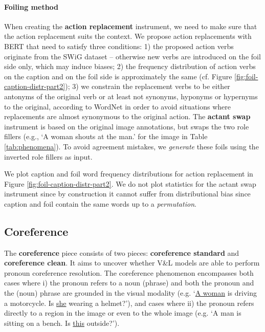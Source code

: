 \documentclass[11pt]{article}
\begin{document}
\paragraph{Foiling method}
When creating the \textbf{action replacement} instrument, we need to make sure that the action replacement suits the context. We propose action replacements with BERT \cite{devlin2019bert} that need to satisfy three conditions: 1) the proposed action verbs originate from the SWiG dataset -- otherwise new verbs are introduced on the foil side only, which may induce biases;
2) the frequency distribution of action verbs on the caption and on the foil side is approximately the same (cf. Figure \ref{fig:foil-caption-distr-part2});
3) we constrain the replacement verbs to be either antonyms of the original verb or at least not synonyms, hyponyms or hypernyms to the original, according to WordNet \cite{wordnet} in order to avoid situations where replacements are almost synonymous to the original action.
The \textbf{actant swap} instrument is based on the original image annotations, but swaps the two role fillers (e.g., `A woman shouts at the man.' for the image in Table \ref{tab:phenomena}). To avoid agreement mistakes, we \textit{generate} these foils using the inverted role fillers as input. 


We plot caption and foil word frequency distributions for action replacement in Figure \ref{fig:foil-caption-distr-part2}. We do not plot statistics for the actant swap instrument since by construction it cannot suffer from distributional bias since caption and foil contain the same words up to a \emph{permutation}.

\subsection{Coreference}\label{app:coref}

The \textbf{coreference} piece consists of two pieces: \textbf{coreference standard} and \textbf{coreference clean}. It aims to uncover whether V\&L models are able to perform pronoun coreference resolution. The coreference phenomenon encompasses both cases where i) the pronoun refers to a noun (phrase) and both the pronoun and the (noun) phrase are grounded in the visual modality (e.g. `\underline{A woman} is driving a motorcycle. Is \underline{she} wearing a helmet?'), and cases where ii) the pronoun refers directly to a region in the image or even to the whole image (e.g. `A man is sitting on a bench. Is \underline{this} outside?').
\end{document}
